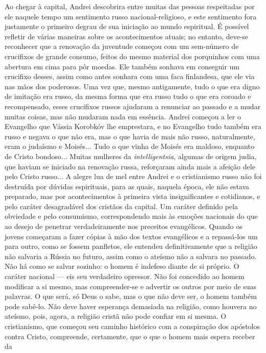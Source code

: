 Ao chegar à capital, Andrei descobrira entre muitas das pessoas
respeitadas por ele naquele tempo um sentimento russo
nacional-religioso, e este sentimento fora justamente o primeiro degrau
de sua iniciação ao mundo espiritual. É possível refletir de várias
maneiras sobre os acontecimentos atuais; no entanto, deve-se reconhecer
que a renovação da juventude começou com um sem-número de crucifixos de
grande consumo, feitos do mesmo material dos porquinhos com uma abertura
em cima para pôr moedas. Ele também sonhava em conseguir um crucifixo
desses, assim como antes sonhara com uma faca finlandesa, que ele via
nas mãos dos poderosos. Uma vez que, mesmo antigamente, tudo o que era
digno de imitação era russo, da mesma forma que era russo tudo o que era
coroado e recompensado, esses crucifixos russos ajudaram a renunciar ao
passado e a mudar muitas coisas, mas não mudaram nada em essência.
Andrei começou a ler o Evangelho que Vássia Korobkóv lhe emprestara, e
no Evangelho tudo também era russo e negava o que não era, mas o que
havia de mais não russo, naturalmente, eram o judaísmo e Moisés... Tudo
o que vinha de Moisés era maldoso, enquanto de Cristo bondoso... Muitas
mulheres da \emph{intelligentsia}, algumas de origem judia, que haviam
se iniciado na renovação russa, reforçaram ainda mais a afeição dele
pelo Cristo russo... A alegre lua de mel entre Andrei e o cristianismo
russo não foi destruída por dúvidas espirituais, para as quais, naquela
época, ele não estava preparado, mas por acontecimentos à primeira vista
insignificantes e cotidianos, e pelo caráter desagradável dos cristãos
da capital. Um caráter definido pela obviedade e pelo consumismo,
correspondendo mais às emoções nacionais do que ao desejo de penetrar
verdadeiramente nos preceitos evangélicos. Quando os jovens começaram a
fazer cópias à mão dos textos evangélicos e a repassá-los um para outro,
como se fossem panfletos, ele entendeu definitivamente que a religião
não salvaria a Rússia no futuro, assim como o ateísmo não a salvara no
passado. Não há como se salvar sozinho: o homem é indefeso diante de si
próprio. O caráter nacional --- eis seu verdadeiro opressor. Não foi
concedido ao homem modificar a si mesmo, mas compreender-se e advertir
os outros por meio de suas palavras. O que será, só Deus o sabe, mas o
que não deve ser, o homem também pode sabê-lo. Não deve haver esperança
demasiada na religião, como houvera no ateísmo, pois, agora, a religião
cristã não pode confiar em si mesma. O cristianismo, que começou seu
caminho histórico com a conspiração dos apóstolos contra Cristo,
compreende, certamente, que o que o homem mais espera receber da
